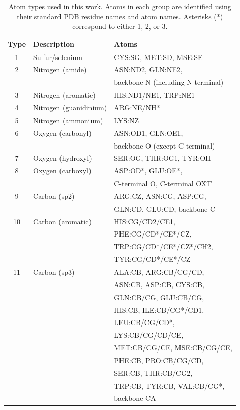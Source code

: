\documentclass{bioinfo}
\begin{document}
\begin{table}[t]
%
  \centering
  \caption {Atom types used in this work. Atoms in each group are
    identified using their standard PDB residue names and atom
    names. Asterisks (*) correspond to either 1, 2, or 3.}
%
\begin{tabular}{ c l l }
    Type & Description & Atoms \\
    \hline
    1 & Sulfur/selenium & CYS:SG, MET:SD, MSE:SE \\ \hline
    2 & Nitrogen (amide) & ASN:ND2, GLN:NE2, \\
     & & backbone N (including N-terminal) \\ \hline
    3 & Nitrogen (aromatic) & HIS:ND1/NE1, TRP:NE1 \\ \hline
    4 & Nitrogen (guanidinium) & ARG:NE/NH* \\ \hline
    5 & Nitrogen (ammonium) & LYS:NZ \\ \hline
    6 & Oxygen (carbonyl) & ASN:OD1, GLN:OE1, \\
     & & backbone O (except C-terminal) \\ \hline
    7 & Oxygen (hydroxyl) & SER:OG, THR:OG1, TYR:OH \\ \hline
    8 & Oxygen (carboxyl) & ASP:OD*, GLU:OE*, \\
     & & C-terminal O, C-terminal OXT \\ \hline
    9 & Carbon (sp2) & ARG:CZ, ASN:CG, ASP:CG, \\
     & & GLN:CD, GLU:CD, backbone C \\ \hline
    10 & Carbon (aromatic) & HIS:CG/CD2/CE1, \\
     & & PHE:CG/CD*/CE*/CZ, \\ 
     & & TRP:CG/CD*/CE*/CZ*/CH2, \\
     & & TYR:CG/CD*/CE*/CZ \\ \hline
    11 & Carbon (sp3) & ALA:CB, ARG:CB/CG/CD, \\
     & & ASN:CB, ASP:CB, CYS:CB, \\
     & & GLN:CB/CG, GLU:CB/CG, \\
     & & HIS:CB, ILE:CB/CG*/CD1, \\
     & & LEU:CB/CG/CD*, \\
     & & LYS:CB/CG/CD/CE, \\
     & & MET:CB/CG/CE, MSE:CB/CG/CE, \\
     & & PHE:CB, PRO:CB/CG/CD, \\
     & & SER:CB, THR:CB/CG2, \\
     & & TRP:CB, TYR:CB, VAL:CB/CG*, \\
     & & backbone CA \\ \hline    
\end{tabular}
\label{Tbl:atomTypes}
\end{table}
\end{document}
